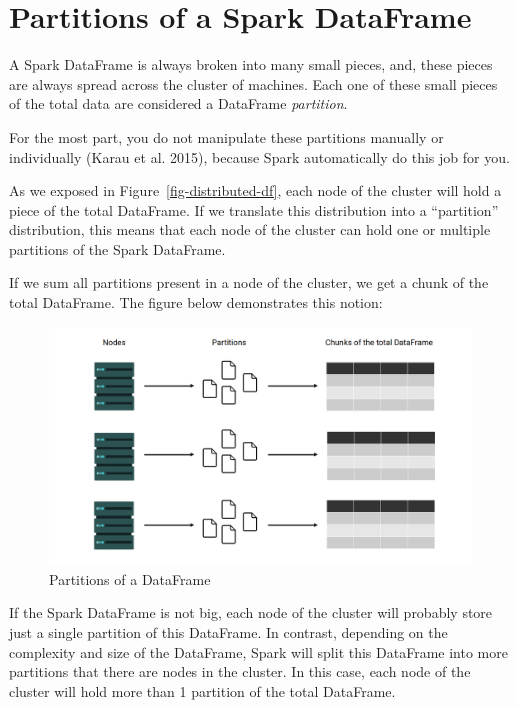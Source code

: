\documentclass[
  11pt,
  letterpaper,
  DIV=11,
  numbers=noendperiod]{scrreprt}
\begin{document}
\hypertarget{sec-dataframe-partitions}{%
\section{Partitions of a Spark
DataFrame}\label{sec-dataframe-partitions}}

A Spark DataFrame is always broken into many small pieces, and, these
pieces are always spread across the cluster of machines. Each one of
these small pieces of the total data are considered a DataFrame
\emph{partition}.

For the most part, you do not manipulate these partitions manually or
individually (Karau et al. 2015), because Spark automatically do this
job for you.

As we exposed in Figure~\ref{fig-distributed-df}, each node of the
cluster will hold a piece of the total DataFrame. If we translate this
distribution into a ``partition'' distribution, this means that each
node of the cluster can hold one or multiple partitions of the Spark
DataFrame.

If we sum all partitions present in a node of the cluster, we get a
chunk of the total DataFrame. The figure below demonstrates this notion:

\begin{figure}

{\centering \includegraphics{Chapters/../Figures/partitions-df.png}

}

\caption{\label{fig-partitions-df}Partitions of a DataFrame}

\end{figure}

If the Spark DataFrame is not big, each node of the cluster will
probably store just a single partition of this DataFrame. In contrast,
depending on the complexity and size of the DataFrame, Spark will split
this DataFrame into more partitions that there are nodes in the cluster.
In this case, each node of the cluster will hold more than 1 partition
of the total DataFrame.
\end{document}
